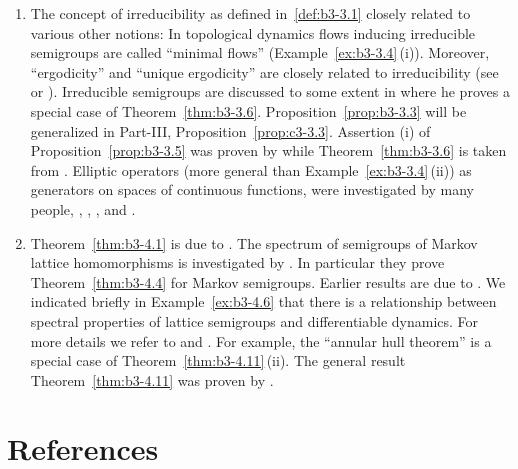 \begin{enumerate}[label=\emph{Section \arabic*:}, wide]
\item
The concept of irreducibility as defined in~\ref{def:b3-3.1} closely related to various other notions:
In topological dynamics flows inducing irreducible semigroups are called \enquote{minimal flows} (\cf Example~\ref{ex:b3-3.4}\,(i)).
Moreover, \enquote{ergodicity} and \enquote{unique ergodicity} are closely related to irreducibility (see \textcite{cornfeldetal:1982} or \textcite{krengel:1985}).
Irreducible semigroups are discussed to some extent in \textcite{davies:1980} where he proves a special case of Theorem~\ref{thm:b3-3.6}.
Proposition~\ref{prop:b3-3.3} will be generalized in Part-III, Proposition~\ref{prop:c3-3.3}.
Assertion (i) of Proposition~\ref{prop:b3-3.5} was proven by \textcite{schaefer:1982} while Theorem~\ref{thm:b3-3.6} is taken from \textcite{greiner:1982}.
Elliptic operators (more general than Example~\ref{ex:b3-3.4}\,(ii)) as generators on spaces of continuous functions, were investigated by many people, \eg \textcite{bonyetal:1968}, \textcite{kuhn:1984}, \textcite{roth:1976}, \textcite{roth:1978} and \textcite{stewart:1974}.

\item
Theorem~\ref{thm:b3-4.1} is due to \textcite{derndinger:1984}.
The spectrum of semigroups of Markov lattice homomorphisms is investigated by \textcite{derndingernagel:1979}.
In particular they prove Theorem~\ref{thm:b3-4.4} for Markov semigroups.
Earlier results are due to \textcite{scarpellini:1974}.
We indicated briefly in Example~\ref{ex:b3-4.6} that there is a relationship between spectral properties of lattice semigroups and differentiable dynamics.
For more details we refer to \textcite{chiconeswanson:1981} and \textcite{sackersell:1978}.
For example, the \enquote{annular hull theorem} is a special case of Theorem~\ref{thm:b3-4.11}\,(ii).
The general result Theorem~\ref{thm:b3-4.11} was proven by \textcite{arendtgreiner:1984}.

\end{enumerate}
\section*{References}
{\RaggedRight
  \printbibliography[heading=none]
 }
 
 
